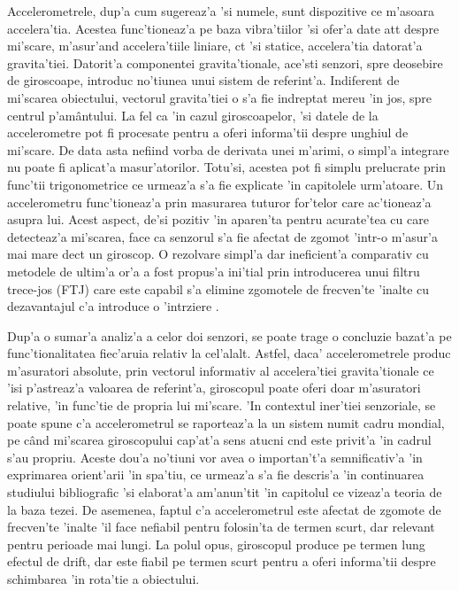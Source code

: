 \documentclass[12pt,a4paper,twoside]{report}
\begin{document}
Accelerometrele, dup'a cum sugereaz'a 'si numele, sunt dispozitive ce m'asoara accelera'tia. Acestea func'tioneaz'a pe baza vibra'tiilor \cite{article} 'si ofer'a date at\ia t despre mi'scare, m'asur'and accelera'tiile liniare, c\ia t 'si statice, accelera'tia datorat'a gravita'tiei.  Datorit'a componentei gravita'tionale, ace'sti senzori, spre deosebire de giroscoape, introduc no'tiunea unui sistem de referint'a. Indiferent de mi'scarea obiectului, vectorul gravita'tiei o s'a fie indreptat mereu 'in jos, spre centrul p'am\^{a}ntului. La fel ca 'in cazul giroscoapelor, 'si datele de la accelerometre pot fi procesate pentru a oferi informa'tii despre unghiul de mi'scare. De data asta nefiind vorba de derivata unei m'arimi, o simpl'a integrare nu poate fi aplicat'a masur'atorilor. Totu'si, acestea pot fi simplu prelucrate prin func'tii trigonometrice ce urmeaz'a s'a fie explicate 'in capitolele urm'atoare. Un accelerometru func'tioneaz'a prin masurarea tuturor for'telor care ac'tioneaz'a asupra lui. Acest aspect, de'si pozitiv 'in aparen'ta pentru acurate'tea cu care detecteaz'a mi'scarea, face ca senzorul s'a fie afectat de zgomot 'intr-o m'asur'a mai mare dec\ia t un giroscop. O rezolvare simpl'a dar ineficient'a comparativ cu metodele de ultim'a or'a a fost propus'a ini'tial prin introducerea unui filtru trece-jos (FTJ) care este capabil s'a elimine zgomotele de frecven'te 'inalte cu dezavantajul c'a introduce o 'int\ia rziere \cite{7334442}.

\vspace{5px}

Dup'a o sumar'a analiz'a a celor doi senzori, se poate trage o concluzie bazat'a pe func'tionalitatea fiec'aruia relativ la cel'alalt. Astfel, daca' accelerometrele produc m'asuratori absolute, prin vectorul informativ al accelera'tiei gravita'tionale ce 'isi p'astreaz'a valoarea de referint'a, giroscopul poate oferi doar m'asuratori relative, 'in func'tie de propria lui mi'scare. 'In contextul iner'tiei senzoriale, se poate spune c'a accelerometrul se raporteaz'a la un sistem numit cadru mondial, pe c\^{a}nd mi'scarea giroscopului cap'at'a sens atucni c\ia nd este privit'a 'in cadrul s'au propriu. Aceste dou'a no'tiuni vor avea o importan't'a semnificativ'a 'in exprimarea orient'arii 'in spa'tiu, ce urmeaz'a s'a fie descris'a 'in continuarea studiului bibliografic 'si elaborat'a am'anun'tit 'in capitolul ce vizeaz'a teoria de la baza tezei. De asemenea, faptul c'a accelerometrul este afectat de zgomote de frecven'te 'inalte 'il face nefiabil pentru folosin'ta de termen scurt, dar relevant pentru perioade mai lungi. La polul opus, giroscopul produce pe termen lung efectul de drift, dar este fiabil pe termen scurt pentru a oferi informa'tii despre schimbarea 'in rota'tie a obiectului.
\end{document}
